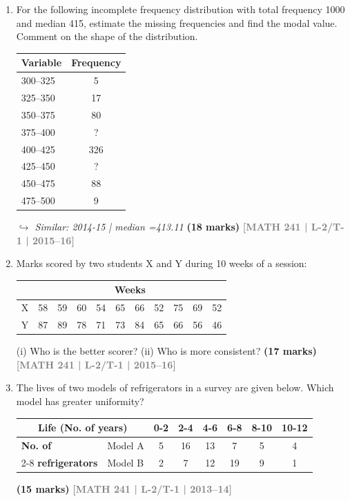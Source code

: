 \documentclass[12pt,a4paper]{article}
\newcommand{\yr}[1]{\hfill\textcolor{gray}{\small\textbf{[#1]}}}
\newcommand{\mk}[1]{\textcolor{orange!70!black}{\small\textbf{(#1 marks)}}}
\newcommand{\variant}[1]{\par\vspace{1pt}\textcolor{blue!50!black}%
  {\footnotesize\itshape$\hookrightarrow$ Similar: #1}}
\begin{document}
\begin{enumerate}
\item For the following incomplete frequency distribution with total frequency 1000 and median 415, estimate the missing frequencies and find the modal value. Comment on the shape of the distribution.
\begin{center}
\begin{tabular}{lc}
\toprule
\textbf{Variable} & \textbf{Frequency} \\
\midrule
300--325 & 5 \\ 325--350 & 17 \\ 350--375 & 80 \\ 375--400 & ? \\ 400--425 & 326 \\ 425--450 & ? \\ 450--475 & 88 \\ 475--500 & 9 \\
\bottomrule
\end{tabular}
\end{center}
\variant{2014-15 | median =413.11}
\mk{18} \yr{MATH 241 | L-2/T-1 | 2015--16}

\item Marks scored by two students X and Y during 10 weeks of a session:
\begin{center}
\begin{tabular}{lrrrrrrrrrr}
\toprule
 & \multicolumn{10}{c}{\textbf{Weeks}} \\
\midrule
X & 58 & 59 & 60 & 54 & 65 & 66 & 52 & 75 & 69 & 52 \\
Y & 87 & 89 & 78 & 71 & 73 & 84 & 65 & 66 & 56 & 46 \\
\bottomrule
\end{tabular}
\end{center}
(i) Who is the better scorer? (ii) Who is more consistent?
\mk{17} \yr{MATH 241 | L-2/T-1 | 2015--16}

\item The lives of two models of refrigerators in a survey are given below. Which model has greater uniformity?
\begin{center}
  \renewcommand{\arraystretch}{1.3} %
\begin{tabular}{|l|l|c|c|c|c|c|c|}
\hline
\multicolumn{2}{|c|}{\textbf{Life (No. of years)}} & \textbf{0-2} & \textbf{2-4} & \textbf{4-6} & \textbf{6-8} & \textbf{8-10} & \textbf{10-12} \\ \hline
\textbf{No. of} & Model A & 5 & 16 & 13 & 7 & 5 & 4 \\ \cline{2-8} 
\textbf{refrigerators} & Model B & 2 & 7 & 12 & 19 & 9 & 1 \\ \hline
\end{tabular}
\end{center}
\mk{15} \yr{MATH 241 | L-2/T-1 | 2013--14}




\end{enumerate}
\end{document}
